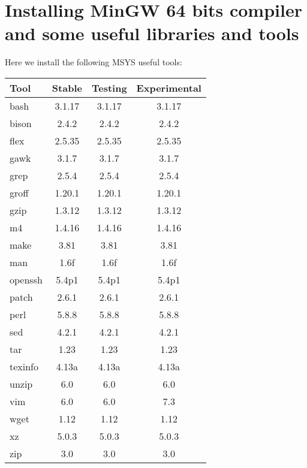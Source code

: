 \documentclass[a4paper]{article}
\begin{document}
\section{Installing MinGW 64 bits compiler and some useful libraries and tools}

Here we install the following MSYS useful tools:
\begin{table}[ht!]
\centering
\begin{tabular}{lccc}
Tool&Stable&Testing&Experimental\\
\hline
bash & 3.1.17 & 3.1.17 & 3.1.17\\
bison & 2.4.2 & 2.4.2 & 2.4.2\\
flex & 2.5.35 & 2.5.35 & 2.5.35\\
gawk & 3.1.7 & 3.1.7 & 3.1.7\\
grep & 2.5.4 & 2.5.4 & 2.5.4\\
groff & 1.20.1 & 1.20.1 & 1.20.1\\
gzip & 1.3.12 & 1.3.12 & 1.3.12\\
m4 & 1.4.16 & 1.4.16 & 1.4.16\\
make & 3.81 & 3.81 & 3.81\\
man & 1.6f & 1.6f & 1.6f\\
openssh & 5.4p1 & 5.4p1 & 5.4p1\\
patch & 2.6.1 & 2.6.1 & 2.6.1\\
perl & 5.8.8 & 5.8.8 & 5.8.8\\
sed & 4.2.1 & 4.2.1 & 4.2.1\\
tar & 1.23 & 1.23 & 1.23\\
texinfo & 4.13a & 4.13a & 4.13a\\
unzip & 6.0 & 6.0 & 6.0\\
vim & 6.0 & 6.0 & 7.3\\
wget & 1.12 & 1.12 & 1.12\\
xz & 5.0.3 & 5.0.3 & 5.0.3\\
zip & 3.0 & 3.0 & 3.0
\end{tabular}
\end{table}
\end{document}
